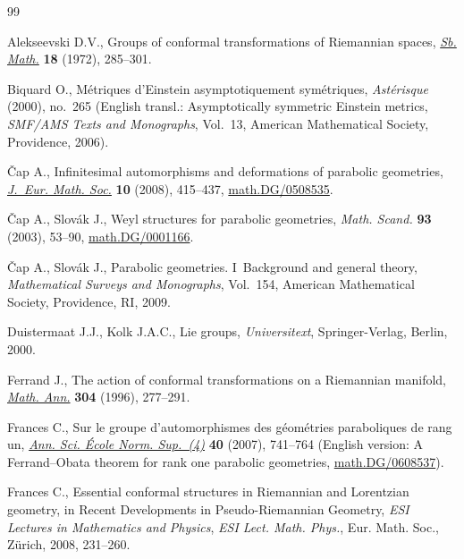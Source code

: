 \documentclass[pdftex]{sigma}
\theoremstyle{plain}
\theoremstyle{definition}
\begin{document}
\begin{thebibliography}{99}

\footnotesize\itemsep=0pt


 Alekseevski D.V.,
Groups of conformal transformations of Riemannian spaces,
\href{http://dx.doi.org/10.1070/SM1972v018n02ABEH001770}{{\it Sb. Math.}} \textbf{18} (1972), 285--301.

 Biquard O.,
M\'etriques d'Einstein asymptotiquement sym\'etriques,
{\it Ast\'erisque} (2000), no.~265 (English transl.: Asymptotically symmetric Einstein metrics, {\it SMF/AMS Texts and Monographs}, Vol.~13,
 American Mathematical Society, Providence, 2006).

 \v{C}ap A.,
 Inf\/initesimal automorphisms and deformations of parabolic geometries,
\href{http://dx.doi.org/10.4171/JEMS/116}{{\it J.~Eur. Math. Soc.}} \textbf{10} (2008), 415--437,
\href{http://arxiv.org/abs/math.DG/0508535}{math.DG/0508535}.

\v{C}ap A., Slov\'ak J.,
Weyl structures for parabolic geometries,
{\it Math. Scand.} \textbf{93}  (2003), 53--90,
\href{http://arxiv.org/abs/math.DG/0001166}{math.DG/0001166}.

 \v{C}ap A., Slov\'ak J.,
 Parabolic geometries. I~Background and general theory,
{\it Mathematical Surveys and Monographs}, Vol.~154, American Mathematical Society, Providence, RI, 2009.

 Duistermaat J.J., Kolk J.A.C.,
 Lie groups, {\it Universitext}, Springer-Verlag, Berlin, 2000.

 Ferrand J.,
 The action of conformal transformations on a Riemannian manifold,
\href{http://dx.doi.org/10.1007/BF01446294}{{\it Math. Ann.}} \textbf{304} (1996), 277--291.

 Frances C.,
 Sur le groupe d'automorphismes des g\'{e}om\'{e}tries paraboliques de rang un,
\href{http://dx.doi.org/10.1016/j.ansens.2007.07.003}{{\it Ann. Sci. \'Ecole Norm. Sup.~(4)}} \textbf{40}  (2007), 741--764
 (English version:  A Ferrand--Obata theorem for rank one parabolic geometries,
\href{http://arxiv.org/abs/math.DG/0608537}{math.DG/0608537}).

 Frances C.,
 Essential conformal structures in Riemannian and Lorentzian geometry,
 in Recent Developments in Pseudo-Riemannian Geometry, {\it ESI Lectures in Mathematics and Physics}, {\it ESI Lect. Math. Phys.},
 Eur. Math. Soc., Z\"urich, 2008, 231--260.


\end{thebibliography}
\end{document}
